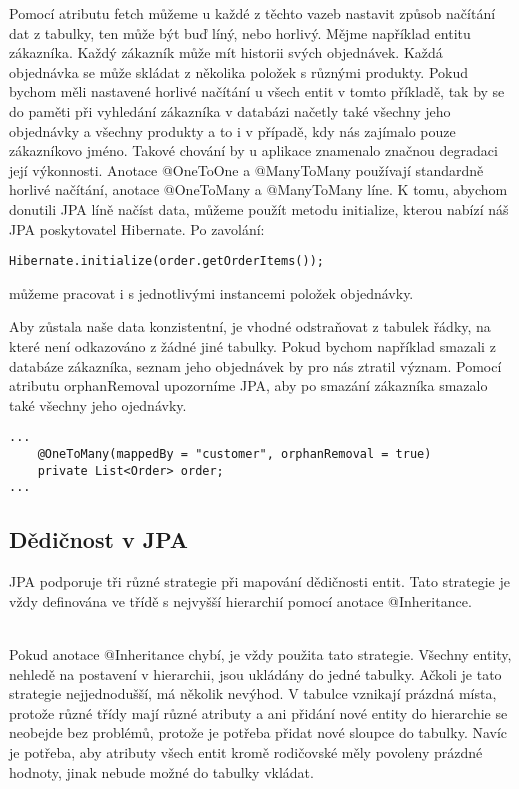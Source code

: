 \documentclass[122pt,oneside]{fithesis}
\begin{document}
Pomocí atributu fetch můžeme u každé z těchto vazeb nastavit způsob načítání dat z tabulky, ten může být buď líný, nebo horlivý. Mějme například entitu zákazníka. Každý zákazník může mít historii svých objednávek. Každá objednávka se může skládat z několika položek s různými produkty. Pokud bychom měli nastavené horlivé načítání u všech entit v tomto příkladě, tak by se do paměti při vyhledání zákazníka v databázi načetly také všechny jeho objednávky a všechny produkty a to i v případě, kdy nás zajímalo pouze zákazníkovo jméno. Takové chování by u aplikace znamenalo značnou degradaci její výkonnosti. Anotace @OneToOne a @ManyToMany používají standardně horlivé načítání, anotace @OneToMany a @ManyToMany líne. K tomu, abychom donutili JPA líně načíst data, můžeme použít metodu initialize, kterou nabízí náš JPA poskytovatel Hibernate. Po zavolání:
\begin{lstlisting}
Hibernate.initialize(order.getOrderItems());
\end{lstlisting}
	můžeme pracovat i s jednotlivými instancemi položek objednávky.

Aby zůstala naše data konzistentní, je vhodné odstraňovat z tabulek řádky, na které není odkazováno z žádné jiné tabulky. Pokud bychom například smazali z databáze zákazníka, seznam jeho objednávek by pro nás ztratil význam. Pomocí atributu orphanRemoval upozorníme JPA, aby po smazání zákazníka smazalo také všechny jeho ojednávky.
\begin{lstlisting}
...
	@OneToMany(mappedBy = "customer", orphanRemoval = true)
	private List<Order> order;
...
\end{lstlisting}
\subsection{Dědičnost v JPA}
JPA podporuje tři různé strategie při mapování dědičnosti entit. Tato strategie je vždy definována ve třídě s nejvyšší hierarchií pomocí anotace @Inheritance.

\vspace{5 mm}
\\\indent Pokud anotace @Inheritance chybí, je vždy použita tato strategie. Všechny entity, nehledě na postavení v hierarchii, jsou ukládány do jedné tabulky. Ačkoli je tato strategie nejjednodušší, má několik nevýhod. V tabulce vznikají prázdná místa, protože různé třídy mají různé atributy a ani přidání nové entity do hierarchie se neobejde bez problémů, protože je potřeba přidat nové sloupce do tabulky. Navíc je potřeba, aby atributy všech entit kromě rodičovské měly povoleny prázdné hodnoty, jinak nebude možné do tabulky vkládat.
\end{document}
